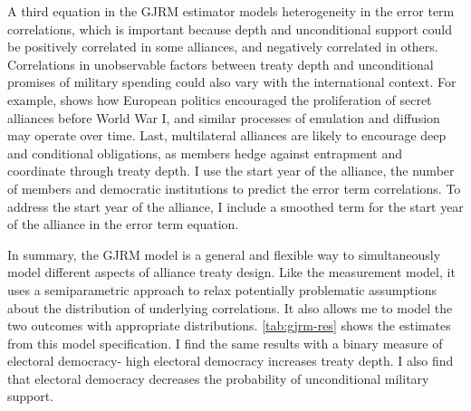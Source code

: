 \documentclass[12pt]{article}
\begin{document}
A third equation in the GJRM estimator models heterogeneity in the error term correlations, which is important because depth and unconditional support could be positively correlated in some alliances, and negatively correlated in others. 
Correlations in unobservable factors between treaty depth and unconditional promises of military spending could also vary with the international context.
For example, \citet{Kuo2019} shows how European politics encouraged the proliferation of secret alliances before World War I, and similar processes of emulation and diffusion may operate over time.
Last, multilateral alliances are likely to encourage deep and conditional obligations, as members hedge against entrapment and coordinate through treaty depth. 
I use the start year of the alliance, the number of members and democratic institutions to predict the error term correlations.
To address the start year of the alliance, I include a smoothed term for the start year of the alliance in the error term equation.  


In summary, the GJRM model is a general and flexible way to simultaneously model different aspects of alliance treaty design.
Like the measurement model, it uses a semiparametric approach to relax potentially problematic assumptions about the distribution of underlying correlations. 
It also allows me to model the two outcomes with appropriate distributions. 
\autoref{tab:gjrm-res} shows the estimates from this model specification. 
I find the same results with a binary measure of electoral democracy- high electoral democracy increases treaty depth.
I also find that electoral democracy decreases the probability of unconditional military support. 
\end{document}
